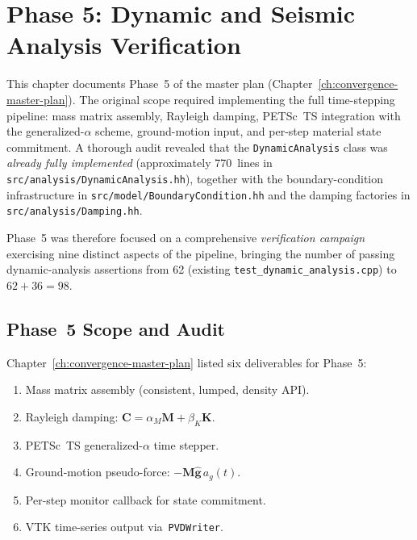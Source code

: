 
\chapter{Phase 5: Dynamic and Seismic Analysis Verification}
\label{ch:phase5-dynamic-seismic}

This chapter documents Phase~5 of the master plan
(Chapter~\ref{ch:convergence-master-plan}).
The original scope required implementing the full time-stepping
pipeline: mass matrix assembly, Rayleigh damping, PETSc~TS
integration with the generalized-$\alpha$ scheme, ground-motion
input, and per-step material state commitment.
A thorough audit revealed that the \texttt{DynamicAnalysis} class
was \emph{already fully implemented} (approximately 770~lines in
\texttt{src/analysis/DynamicAnalysis.hh}), together with the
boundary-condition infrastructure in
\texttt{src/model/BoundaryCondition.hh} and the damping factories
in \texttt{src/analysis/Damping.hh}.

Phase~5 was therefore focused on a comprehensive \emph{verification
campaign} exercising nine distinct aspects of the pipeline, bringing
the number of passing dynamic-analysis assertions from 62 (existing
\texttt{test\_dynamic\_analysis.cpp}) to $62+36=98$.


\section{Phase~5 Scope and Audit}
\label{sec:phase5-scope}

Chapter~\ref{ch:convergence-master-plan} listed six deliverables for
Phase~5:
\begin{enumerate}
  \item Mass matrix assembly (consistent, lumped, density API).
  \item Rayleigh damping: $\mathbf{C}=\alpha_M\mathbf{M}+\beta_K\mathbf{K}$.
  \item PETSc~TS generalized-$\alpha$ time stepper.
  \item Ground-motion pseudo-force: $-\mathbf{M}\hat{\mathbf{g}}\,a_g(t)$.
  \item Per-step monitor callback for state commitment.
  \item VTK time-series output via~\texttt{PVDWriter}.
\end{enumerate}

